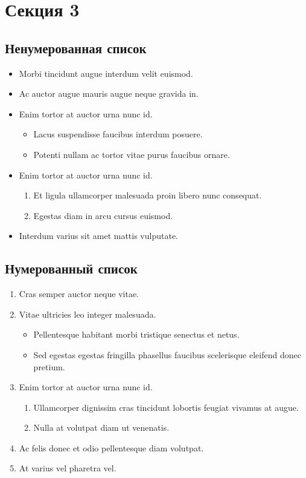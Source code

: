 \section{Секция 3}

\subsection{Ненумерованная список}

\begin{itemize}
    \item Morbi tincidunt augue interdum velit euismod. 
    \item Ac auctor augue mauris augue neque gravida in. 
    \item Enim tortor at auctor urna nunc id. 
    \begin{itemize}
        \item Lacus suspendisse faucibus interdum posuere. 
        \item Potenti nullam ac tortor vitae purus faucibus ornare. 
    \end{itemize}
    \item Enim tortor at auctor urna nunc id. 
    \begin{enumerate}
        \item Et ligula ullamcorper malesuada proin libero nunc consequat. 
        \item Egestas diam in arcu cursus euismod. 
    \end{enumerate}
    \item Interdum varius sit amet mattis vulputate.
\end{itemize}

\subsection{Нумерованный список}

\begin{enumerate}
    \item Cras semper auctor neque vitae. 
    \item Vitae ultricies leo integer malesuada. 
    \begin{itemize}
        \item Pellentesque habitant morbi tristique senectus et netus. 
        \item Sed egestas egestas fringilla phasellus faucibus scelerisque eleifend donec pretium. 
    \end{itemize}
    \item Enim tortor at auctor urna nunc id. 
    \begin{enumerate}
        \item Ullamcorper dignissim cras tincidunt lobortis feugiat vivamus at augue. 
        \item Nulla at volutpat diam ut venenatis. 
    \end{enumerate}
    \item Ac felis donec et odio pellentesque diam volutpat. 
    \item At varius vel pharetra vel.
\end{enumerate}

\clearpage